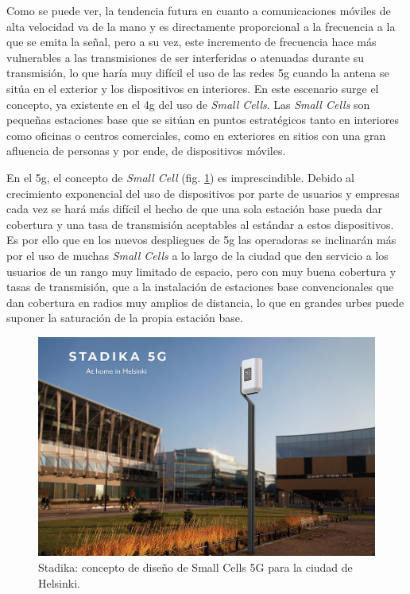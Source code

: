 \par Como se puede ver, la tendencia futura en cuanto a comunicaciones móviles de alta velocidad va de la mano y es directamente proporcional a la frecuencia a la que se emita la señal, pero a su vez, este incremento de frecuencia hace más vulnerables a las transmisiones de ser interferidas o atenuadas durante su transmisión, lo que haría muy difícil el uso de las redes \gls{5g} cuando la antena se sitúa en el exterior y los dispositivos en interiores. En este escenario surge el concepto, ya existente en el \gls{4g} del uso de \textit{Small Cells}. Las \textit{Small Cells} son pequeñas estaciones base que se sitúan en puntos estratégicos tanto en interiores como oficinas o centros comerciales, como en exteriores en sitios con una gran afluencia de personas y por ende, de dispositivos móviles. 
\\
\par En el \gls{5g}, el concepto de \textit{Small Cell} (fig. \ref{fig:stadika}) es imprescindible. Debido al crecimiento exponencial del uso de dispositivos por parte de usuarios y empresas cada vez se hará más difícil el hecho de que una sola estación base pueda dar cobertura y una tasa de transmisión aceptables al estándar a estos dispositivos. Es por ello que en los nuevos despliegues de \gls{5g} las operadoras se inclinarán más por el uso de muchas \textit{Small Cells} a lo largo de la ciudad que den servicio a los usuarios de un rango muy limitado de espacio, pero con muy buena cobertura y tasas de transmisión, que a la instalación de estaciones base convencionales que dan cobertura en radios muy amplios de distancia, lo que en grandes urbes puede suponer la saturación de la propia estación base.
\\
\begin{figure}[h]
    \centering
        \includegraphics[width=\textwidth]{archivos/stadika}
        \caption{Stadika: concepto de diseño de Small Cells 5G para la ciudad de Helsinki. \cite{Muesa2019}}
        \label{fig:stadika}
\end{figure}

